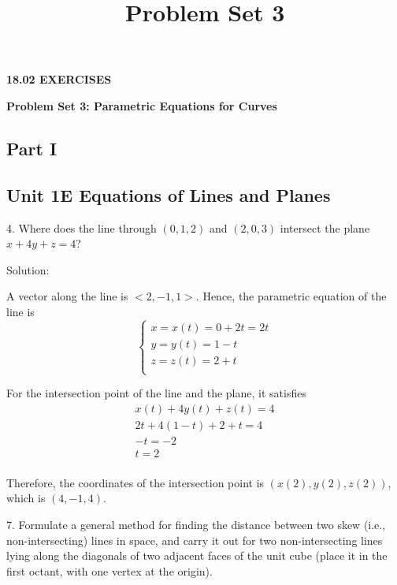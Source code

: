 \documentclass{article}
\title{Problem Set 3}
\author{}
\date{}
\begin{document}
\begin{center}
{\rmfamily\bfseries\Large 18.02 EXERCISES}

\vspace{25px}

{\rmfamily\bfseries\LARGE Problem Set 3: Parametric Equations for Curves}
\end{center}

\begin{center}
\section*{Part I}
\end{center}

\subsection*{Unit 1E Equations of Lines and Planes}

\bigskip

4. Where does the line through $(0, 1, 2)$ and $(2, 0, 3)$ intersect the plane 
$x + 4y + z = 4$?

Solution:

A vector along the line is $<2, -1, 1>$. Hence, the parametric equation of the 
line is
\begin{equation*}
  \begin{cases}
    x = x(t) = 0 + 2t = 2t \\
    y = y(t) = 1 - t \\
    z = z(t) = 2 + t \\
  \end{cases}
\end{equation*}

For the intersection point of the line and the plane, it satisfies
\begin{gather*}
  x(t) + 4y(t) + z(t) = 4 \\
  2t + 4(1 - t) + 2 + t = 4 \\
  -t = -2 \\
  t = 2 \\
\end{gather*}

Therefore, the coordinates of the intersection point is $(x(2), y(2), z(2))$, 
which is $(4, -1, 4)$.

\bigskip

7. Formulate a general method for finding the distance between two skew (i.e., 
non-intersecting) lines in space, and carry it out for two non-intersecting 
lines lying along the diagonals of two adjacent faces of the unit cube (place it 
in the first octant, with one vertex at the origin).
\end{document}
